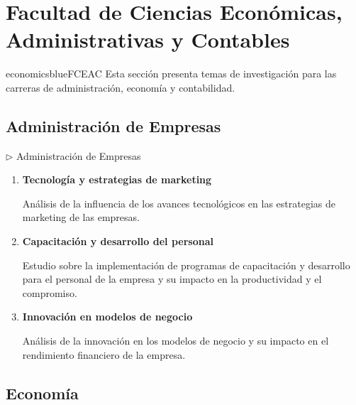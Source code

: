 \documentclass[12pt,a4paper]{article}
\begin{document}
\section{Facultad de Ciencias Económicas, Administrativas y Contables}

\begin{facultybox}{economicsblue}{FCEAC}
Esta sección presenta temas de investigación para las carreras de administración, economía y contabilidad.
\end{facultybox}

\subsection{Administración de Empresas}

\begin{careerbox}{$\triangleright$ Administración de Empresas}
	\begin{enumerate}
		\item \textbf{Tecnología y estrategias de marketing}
		
		Análisis de la influencia de los avances tecnológicos en las estrategias de marketing de las empresas.
		
		\item \textbf{Capacitación y desarrollo del personal}
		
		Estudio sobre la implementación de programas de capacitación y desarrollo para el personal de la empresa y su impacto en la productividad y el compromiso.
		
		\item \textbf{Innovación en modelos de negocio}
		
		Análisis de la innovación en los modelos de negocio y su impacto en el rendimiento financiero de la empresa.
	\end{enumerate}
\end{careerbox}

\subsection{Economía}
\end{document}
